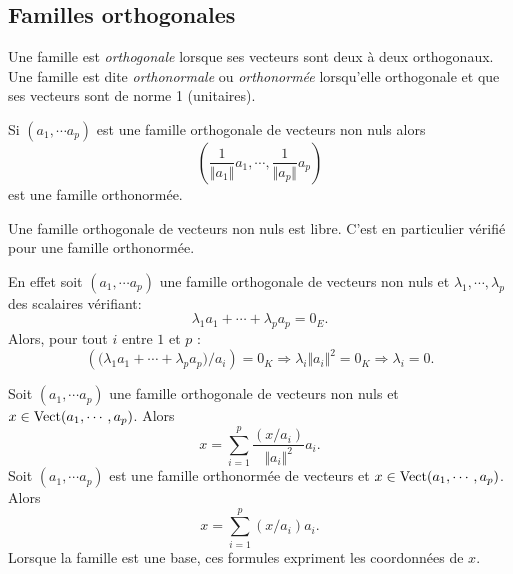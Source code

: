 \subsection{Familles orthogonales}
 \begin{defi}
  Une famille est \emph{orthogonale} lorsque ses vecteurs sont deux à deux orthogonaux. Une famille est dite \emph{orthonormale} ou \emph{orthonormée} lorsqu'elle orthogonale et que ses vecteurs sont de norme 1 (unitaires).
 \end{defi}
\begin{rem}
  Si $(a_1,\cdots a_p)$ est une famille orthogonale de vecteurs non nuls alors 
\begin{displaymath}
 (\frac{1}{\Vert a_1\Vert}a_1,\cdots, \frac{1}{\Vert a_p\Vert}a_p)
\end{displaymath}
est une famille orthonormée.
\end{rem}

\begin{prop}
 Une famille orthogonale de vecteurs non nuls est libre. C'est en particulier vérifié pour une famille orthonormée.
\end{prop}
\begin{demo}
 En effet soit $(a_1,\cdots a_p)$ une famille orthogonale de vecteurs non nuls et $\lambda_1, \cdots, \lambda_p$  des scalaires vérifiant:
\begin{displaymath}
 \lambda_1 a_1 +\cdots +\lambda_p a_p = 0_E .
\end{displaymath}
Alors, pour tout $i$ entre $1$ et $p$ :
\begin{displaymath}
 \left( \bigl(\lambda_1 a_1 +\cdots +\lambda_p a_p\bigr)/a_i\right)  = 0_K\Rightarrow
\lambda_i \Vert a_i\Vert^2=0_K\Rightarrow\lambda_i=0 .
\end{displaymath}
\end{demo}
\begin{prop}
 Soit $(a_1,\cdots a_p)$ une famille orthogonale de vecteurs non nuls et $x\in \mathop{\mathrm{Vect}}(a_1,\cdots,a_p)$. Alors
\begin{displaymath}
 x = \sum_{i=1}^p\frac{(x/a_i)}{\Vert a_i\Vert^2}a_i.
\end{displaymath}
 Soit $(a_1,\cdots a_p)$ est une famille orthonormée de vecteurs et $x\in \mathop{\mathrm{Vect}}(a_1,\cdots,a_p)$. Alors
\begin{displaymath}
 x = \sum_{i=1}^p (x/a_i) a_i .
\end{displaymath}
Lorsque la famille est une base, ces formules expriment les coordonnées de $x$.
\end{prop}

